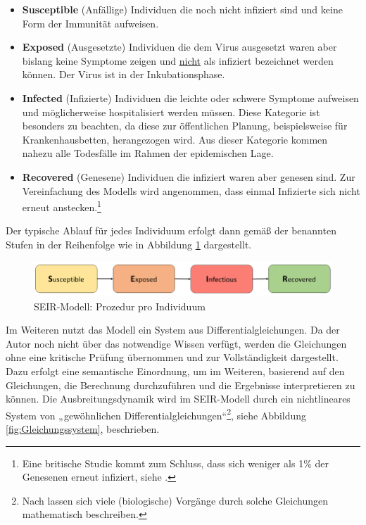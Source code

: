 \documentclass[12pt]{article}
\begin{document}
\begin{itemize}
    \item \textbf{Susceptible} (Anfällige) Individuen die noch nicht infiziert sind und keine Form der Immunität aufweisen.
    \item \textbf{Exposed} (Ausgesetzte) Individuen die dem Virus ausgesetzt waren aber bislang keine Symptome zeigen und \underline{nicht} als infiziert bezeichnet werden können. Der Virus ist in der Inkubationsphase.
    \item \textbf{Infected} (Infizierte) Individuen die leichte oder schwere Symptome aufweisen und möglicherweise hospitalisiert werden müssen. Diese Kategorie ist besonders zu beachten, da diese zur öffentlichen Planung, beispielsweise für Krankenhausbetten, herangezogen wird. Aus dieser Kategorie kommen nahezu alle Todesfälle im Rahmen der epidemischen Lage.
    \item \textbf{Recovered} (Genesene) Individuen die infiziert waren aber genesen sind. Zur Vereinfachung des Modells wird angenommen, dass einmal Infizierte sich nicht erneut anstecken.\footnote{Eine britische Studie kommt zum Schluss, dass sich weniger als 1\% der Genesenen erneut infiziert, siehe \cite{mdrWissen}.}
\end{itemize}

Der typische Ablauf für jedes Individuum erfolgt dann gemäß der benannten Stufen in der Reihenfolge wie in Abbildung \ref{fig:SEIR_einfach} dargestellt.
\begin{figure}[H]
\centering
\includegraphics[scale=0.5]{SEIR_einfach}
\caption{SEIR-Modell: Prozedur pro Individuum}
\label{fig:SEIR_einfach}
\end{figure}

Im Weiteren nutzt das Modell ein System aus Differentialgleichungen. Da der Autor noch nicht über das notwendige Wissen verfügt, werden die Gleichungen ohne eine kritische Prüfung übernommen und zur Vollständigkeit dargestellt. Dazu erfolgt eine semantische Einordnung, um im Weiteren, basierend auf den Gleichungen, die Berechnung durchzuführen und die Ergebnisse interpretieren zu können. Die Ausbreitungsdynamik wird im SEIR-Modell durch ein nichtlineares System von „gewöhnlichen Differentialgleichungen“\footnote{Nach \cite{DiffGl} lassen sich viele (biologische) Vorgänge durch solche Gleichungen mathematisch beschreiben.}, siehe Abbildung \ref{fig:Gleichungssystem}, beschrieben.
\end{document}
